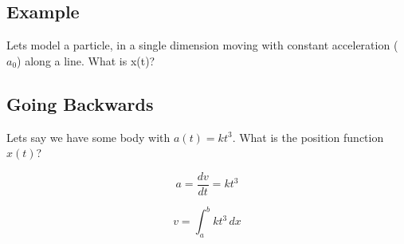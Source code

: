 \subsection*{Example}
Lets model a particle, in a single dimension moving with constant acceleration ($a_0$) along a line. What is x(t)?

\subsection*{Going Backwards}
Lets say we have some body with $a(t) = k t^3$. What is the position function $x(t)$?

\[
    a = \frac{dv}{dt} = kt^3
\]

\[
    v = \int_{a}^{b} kt^3 \, dx
\]

